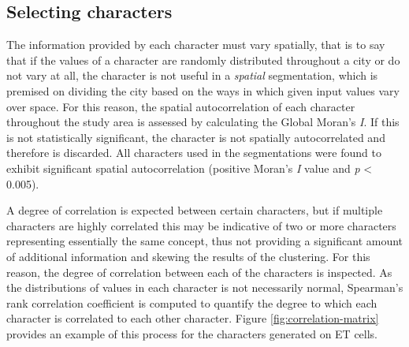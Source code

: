\documentclass[a4paper, nobind]{templates/ociamthesis}
\begin{document}
\hypertarget{selecting-characters}{%
\subsection{Selecting characters}\label{selecting-characters}}

The information provided by each character must vary spatially, that is to say that if the values of a character are randomly distributed throughout a city or do not vary at all, the character is not useful in a \emph{spatial} segmentation, which is premised on dividing the city based on the ways in which given input values vary over space. For this reason, the spatial autocorrelation of each character throughout the study area is assessed by calculating the Global Moran's \emph{I}. If this is not statistically significant, the character is not spatially autocorrelated and therefore is discarded. All characters used in the segmentations were found to exhibit significant spatial autocorrelation (positive Moran's \emph{I} value and \emph{p} \textless{} 0.005).

A degree of correlation is expected between certain characters, but if multiple characters are highly correlated this may be indicative of two or more characters representing essentially the same concept, thus not providing a significant amount of additional information and skewing the results of the clustering. For this reason, the degree of correlation between each of the characters is inspected. As the distributions of values in each character is not necessarily normal, Spearman's rank correlation coefficient is computed to quantify the degree to which each character is correlated to each other character. Figure \ref{fig:correlation-matrix} provides an example of this process for the characters generated on ET cells.
\end{document}
